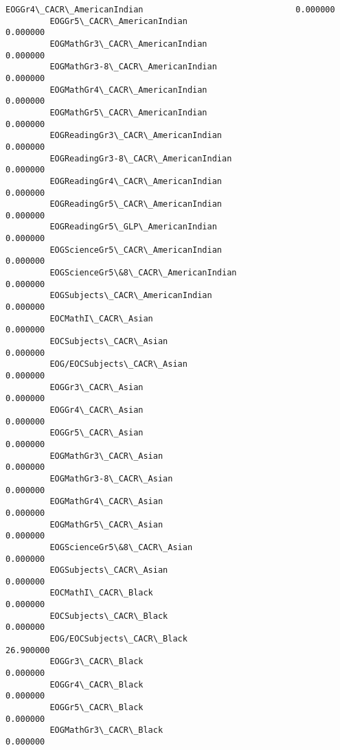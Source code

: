 \documentclass[11pt]{article}
\begin{document}
\begin{Verbatim}[commandchars=\\\{\}]
         EOGGr4\_CACR\_AmericanIndian                               0.000000   
         EOGGr5\_CACR\_AmericanIndian                               0.000000   
         EOGMathGr3\_CACR\_AmericanIndian                           0.000000   
         EOGMathGr3-8\_CACR\_AmericanIndian                         0.000000   
         EOGMathGr4\_CACR\_AmericanIndian                           0.000000   
         EOGMathGr5\_CACR\_AmericanIndian                           0.000000   
         EOGReadingGr3\_CACR\_AmericanIndian                        0.000000   
         EOGReadingGr3-8\_CACR\_AmericanIndian                      0.000000   
         EOGReadingGr4\_CACR\_AmericanIndian                        0.000000   
         EOGReadingGr5\_CACR\_AmericanIndian                        0.000000   
         EOGReadingGr5\_GLP\_AmericanIndian                         0.000000   
         EOGScienceGr5\_CACR\_AmericanIndian                        0.000000   
         EOGScienceGr5\&8\_CACR\_AmericanIndian                      0.000000   
         EOGSubjects\_CACR\_AmericanIndian                          0.000000   
         EOCMathI\_CACR\_Asian                                      0.000000   
         EOCSubjects\_CACR\_Asian                                   0.000000   
         EOG/EOCSubjects\_CACR\_Asian                               0.000000   
         EOGGr3\_CACR\_Asian                                        0.000000   
         EOGGr4\_CACR\_Asian                                        0.000000   
         EOGGr5\_CACR\_Asian                                        0.000000   
         EOGMathGr3\_CACR\_Asian                                    0.000000   
         EOGMathGr3-8\_CACR\_Asian                                  0.000000   
         EOGMathGr4\_CACR\_Asian                                    0.000000   
         EOGMathGr5\_CACR\_Asian                                    0.000000   
         EOGScienceGr5\&8\_CACR\_Asian                               0.000000   
         EOGSubjects\_CACR\_Asian                                   0.000000   
         EOCMathI\_CACR\_Black                                      0.000000   
         EOCSubjects\_CACR\_Black                                   0.000000   
         EOG/EOCSubjects\_CACR\_Black                              26.900000   
         EOGGr3\_CACR\_Black                                        0.000000   
         EOGGr4\_CACR\_Black                                        0.000000   
         EOGGr5\_CACR\_Black                                        0.000000   
         EOGMathGr3\_CACR\_Black                                    0.000000   

\end{Verbatim}
\end{document}
